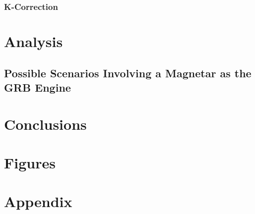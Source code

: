 \documentclass[11pt,letterpaper]{article}
\begin{document}
\subsubsection{K-Correction}

\section{Analysis}

\subsection{Possible Scenarios Involving a Magnetar as the GRB Engine}

\section{Conclusions} 

\section{Figures}

\section{Appendix}

\newpage



\end{document}
